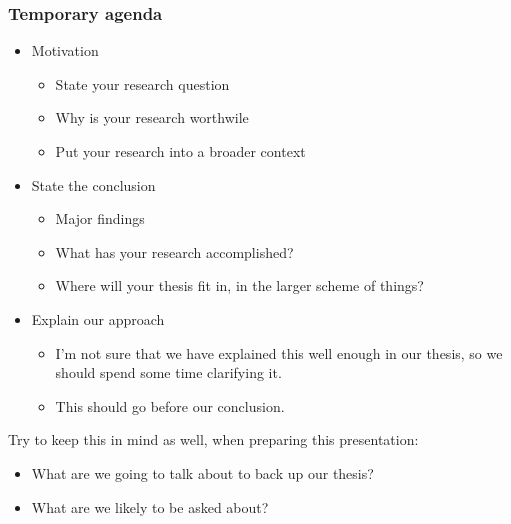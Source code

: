 \begin{frame}
\frametitle{Temporary agenda}

\begin{itemize}
\item Motivation
%
  \begin{itemize}
  \item State your research question
  \item Why is your research worthwile
  \item Put your research into a broader context
  \end{itemize}
%
\item State the conclusion
%
  \begin{itemize}
  \item Major findings
  \item What has your research accomplished?
  \item Where will your thesis fit in, in the larger scheme of things?
  \end{itemize}
%
\item Explain our approach
%
  \begin{itemize}
  \item I'm not sure that we have explained this well enough in our thesis, so we should spend some time clarifying it.
  \item This should go before our conclusion.
  \end{itemize}
\end{itemize}

Try to keep this in mind as well, when preparing this presentation:
%
\begin{itemize}
\item What are we going to talk about to back up our thesis?
\item What are we likely to be asked about?
\end{itemize}
\end{frame}
